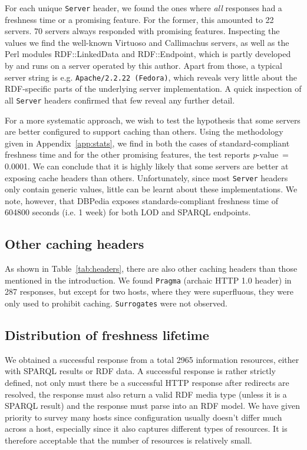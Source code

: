 \documentclass{llncs}
\newcommand{\pvalue}{\textit{p}-value\ }
\newcommand{\httph}[1]{\texttt{#1}}
\begin{document}
For each unique \httph{Server} header, we found the ones where
\emph{all} responses had a freshness time or a promising feature. For
the former, this amounted to 22 servers. 70 servers always responded
with promising features. Inspecting the values we find the well-known
Virtuoso and Callimachus servers, as well as the Perl modules
RDF::LinkedData and RDF::Endpoint, which is partly developed by and
runs on a server operated by this author. Apart from those, a typical
server string is e.g. \httph{Apache/2.2.22 (Fedora)}, which reveals
very little about the RDF-specific parts of the underlying server
implementation. A quick inspection of all \httph{Server} headers
confirmed that few reveal any further detail.

For a more systematic approach, we wish to test the hypothesis that
some servers are better configured to support caching than others.
Using the methodology given in Appendix~\ref{app:stats}, we find in
both the cases of standard-compliant freshness time and for the other
promising features, the test reports \pvalue = 0.0001. We can conclude
that it is highly likely that some servers are better at exposing
cache headers than others. Unfortunately, since most \httph{Server}
headers only contain generic values, little can be learnt about these
implementations. We note, however, that DBPedia exposes
standards-compliant freshness time of 604800 seconds (i.e. 1 week) for
both LOD and SPARQL endpoints.

\subsection{Other caching headers}

As shown in Table~\ref{tab:headers}, there are also other caching
headers than those mentioned in the introduction. We found
\httph{Pragma} (archaic HTTP 1.0 header) in 287 responses, but except
for two hosts, where they were superfluous, they were only used to
prohibit caching. \httph{Surrogates} were not observed.

\subsection{Distribution of freshness lifetime}

We obtained a successful response from a total 2965 information
resources, either with SPARQL results or RDF data. A successful
response is rather strictly defined, not only must there be a
successful HTTP response after redirects are resolved, the response
must also return a valid RDF media type (unless it is a SPARQL result)
and the response must parse into an RDF model. We have given priority
to survey many hosts since configuration usually doesn't differ much
across a host, especially since it also captures different types of
resources. It is therefore acceptable that the number of resources is
relatively small.
\end{document}
